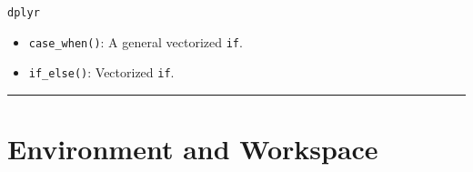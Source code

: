 \documentclass[
]{book}
\providecommand{\tightlist}{%
  \setlength{\itemsep}{0pt}\setlength{\parskip}{0pt}}
\begin{document}
\texttt{dplyr}

\begin{itemize}
\tightlist
\item
  \texttt{case\_when()}: A general vectorized \texttt{if}.
\item
  \texttt{if\_else()}: Vectorized \texttt{if}.
\end{itemize}

\begin{center}\rule{0.5\linewidth}{0.5pt}\end{center}

\hypertarget{environment-and-workspace}{%
\section{Environment and Workspace}\label{environment-and-workspace}}
\end{document}
